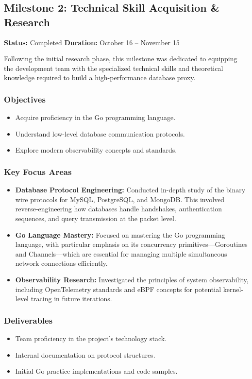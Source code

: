 
\subsection{Milestone 2: Technical Skill Acquisition \& Research}
\textbf{Status:} Completed \hfill \textbf{Duration:} October 16 -- November 15

Following the initial research phase, this milestone was dedicated to equipping the development team with the specialized technical skills and theoretical knowledge required to build a high-performance database proxy.

\subsubsection{Objectives}
\begin{itemize}
    \item Acquire proficiency in the Go programming language.
    \item Understand low-level database communication protocols.
    \item Explore modern observability concepts and standards.
\end{itemize}

\subsubsection{Key Focus Areas}
\begin{itemize}
    \item \textbf{Database Protocol Engineering:} Conducted in-depth study of the binary wire protocols for MySQL, PostgreSQL, and MongoDB. This involved reverse-engineering how databases handle handshakes, authentication sequences, and query transmission at the packet level.
    \item \textbf{Go Language Mastery:} Focused on mastering the Go programming language, with particular emphasis on its concurrency primitives---Goroutines and Channels---which are essential for managing multiple simultaneous network connections efficiently.
    \item \textbf{Observability Research:} Investigated the principles of system observability, including OpenTelemetry standards and eBPF concepts for potential kernel-level tracing in future iterations.
\end{itemize}

\subsubsection{Deliverables}
\begin{itemize}
    \item Team proficiency in the project's technology stack.
    \item Internal documentation on protocol structures.
    \item Initial Go practice implementations and code samples.
\end{itemize}

